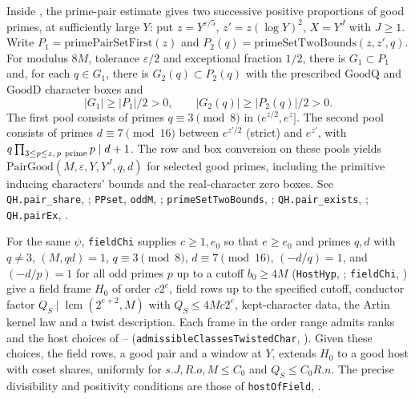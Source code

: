 \begin{formalstatement}
Inside , the prime-pair estimate gives two successive
positive proportions of good primes, at sufficiently large $Y$:
put $z=Y^{\varepsilon/5}$, $z'=z(\log Y)^2$, $X=Y^J$ with $J\ge1$.
Write $P_1=\mathrm{primePairSetFirst}(z)$ and
$P_2(q)=\mathrm{primeSetTwoBounds}(z,z',q)$.
For modulus $8M$, tolerance $\varepsilon/2$ and exceptional fraction
$1/2$, there is $G_1\subset P_1$ and, for each $q\in G_1$,
there is $G_2(q)\subset P_2(q)$ with the prescribed
$\mathrm{GoodQ}$ and $\mathrm{GoodD}$ character boxes and
\[
 |G_1|\ge |P_1|/2>0,\qquad |G_2(q)|\ge |P_2(q)|/2>0 .
\]
The first pool consists of primes $q\equiv3\pmod8$ in $(e^{z/2},e^z]$. The second pool consists of primes $d\equiv7\pmod {16}$ between
$e^{z'/2}$ (strict) and $e^{z'}$, with
$q\prod_{3\le p\le z,\,p\ {\rm prime}}p\mid d+1$. The row and box conversion
on these pools yields $\mathrm{PairGood}(M,\varepsilon,Y,Y^J,q,d)$
for selected good primes, including the primitive inducing characters'
bounds and the real-character zero boxes. See
\nolinkurl{QH.pair_share}, ;
\nolinkurl{PPset}, \nolinkurl{oddM}, ;
\nolinkurl{primeSetTwoBounds}, ;
\nolinkurl{QH.pair_exists}, ;
\nolinkurl{QH.pairEx}, .

For the same $\psi$, \nolinkurl{fieldChi} supplies $c\ge1,e_0$
so that $e\ge e_0$ and primes $q,d$
with $q\ne3$, $(M,qd)=1$, $q\equiv3\pmod 8$, $d\equiv7\pmod {16}$,
$(-d/q)=1$, and $(-d/p)=1$ for all odd primes $p$ up to a cutoff $b_0\ge4M$
(\nolinkurl{HostHyp}, ;
\nolinkurl{fieldChi}, )
give a field frame $H_0$ of order $c2^e$, field rows up to the specified
cutoff, conductor factor $Q_S\mid\operatorname{lcm}(2^{e+2},M)$ with
$Q_S\le4Mc2^e$, kept-character data, the Artin kernel law and a twist
description. Each frame in the order range admits ranks and the host
choices of --
(\nolinkurl{admissibleClassesTwistedChar}, ).
Given these choices, the field rows, a good pair and a window at $Y$,
 extends $H_0$ to a good host with coset shares, uniformly
for $s.J,R.o,M\le C_0$ and $Q_S\le C_0R.n$.
The precise divisibility and positivity conditions are those of
\nolinkurl{hostOfField}, .
\end{formalstatement}

